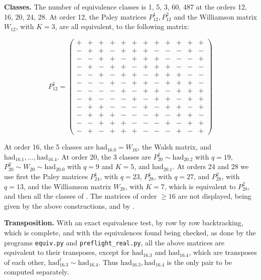 \documentclass[11pt]{amsart}
\begin{document}
\medskip

\noindent\textbf{Classes.} The number of equivalence classes is 1, 5, 3, 60, 487 at the orders 12, 16, 20, 24, 28. At order 12, the Paley matrices $P_{12}^1,P_{12}^2$ and the Williamson matrix $W_{12}$, with $K=3$, are all equivalent, to the following matrix:

{\normalsize\setlength{\arraycolsep}{3.5pt}$$P_{12}^1=\left(\begin{array}{cccccccccccc}+ & + & + & + & + & + & + & + & + & + & + & +\\ - & + & + & - & + & + & + & - & - & - & + & -\\ - & - & + & + & - & + & + & + & - & - & - & +\\ - & + & - & + & + & - & + & + & + & - & - & -\\ - & - & + & - & + & + & - & + & + & + & - & -\\ - & - & - & + & - & + & + & - & + & + & + & -\\ - & - & - & - & + & - & + & + & - & + & + & +\\ - & + & - & - & - & + & - & + & + & - & + & +\\ - & + & + & - & - & - & + & - & + & + & - & +\\ - & + & + & + & - & - & - & + & - & + & + & -\\ - & - & + & + & + & - & - & - & + & - & + & +\\ - & + & - & + & + & + & - & - & - & + & - & +\end{array}\right)$$}

\noindent At order 16, the 5 classes are $\mathrm{had}_{16.0}=W_{16}$, the Walsh matrix, and $\mathrm{had}_{16.1},\ldots,\mathrm{had}_{16.4}$. At order 20, the 3 classes are $P_{20}^1\sim\mathrm{had}_{20.2}$ with $q=19$, $P_{20}^2\sim W_{20}\sim\mathrm{had}_{20.0}$ with $q=9$ and $K=5$, and $\mathrm{had}_{20.1}$. At orders 24 and 28 we use first the Paley matrices $P_{24}^1$, with $q=23$, $P_{28}^1$, with $q=27$, and $P_{28}^2$, with $q=13$, and the Williamson matrix $W_{28}$, with $K=7$, which is equivalent to $P_{28}^2$, and then all the classes of \cite{mck}. The matrices of order $\geq16$ are not displayed, being given by the above constructions, and by \cite{mck}.

\medskip

\noindent\textbf{Transposition.} With an exact equivalence test, by row by row backtracking, which is complete, and with the equivalences found being checked, as done by the programs \texttt{equiv.py} and \texttt{preflight\_real.py}, all the above matrices are equivalent to their transposes, except for $\mathrm{had}_{16.3}$ and $\mathrm{had}_{16.4}$, which are transposes of each other, $\mathrm{had}_{16.3}^t\sim\mathrm{had}_{16.4}$. Thus $\mathrm{had}_{16.3},\mathrm{had}_{16.4}$ is the only pair to be computed separately.
\end{document}
